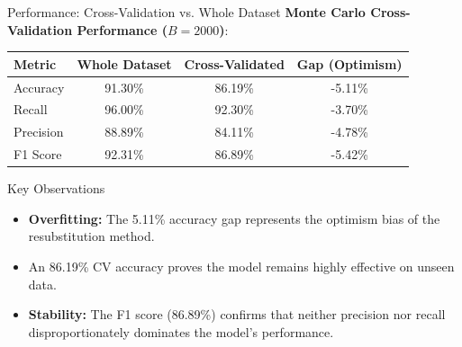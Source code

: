 \documentclass[8pt, aspectratio=169]{beamer}
\begin{document}
\begin{frame}{Performance: Cross-Validation vs. Whole Dataset}
    \textbf{Monte Carlo Cross-Validation Performance ($B=2000$)}:
    \begin{table}
        \centering
        \begin{tabular}{lccc}
            \toprule
            Metric & Whole Dataset & Cross-Validated & Gap (Optimism) \\
            \midrule
            Accuracy & 91.30\% & 86.19\% & -5.11\% \\
            Recall  & 96.00\% & 92.30\% & -3.70\% \\
            Precision & 88.89\% & 84.11\% & -4.78\% \\
            F1 Score & 92.31\% & 86.89\% &  -5.42\% \\
            \bottomrule
        \end{tabular}
    \end{table}
    \begin{alertblock}{Key Observations}
        \begin{itemize}
        \item \textbf{Overfitting:} The 5.11\% accuracy gap represents the optimism bias of the resubstitution method.
        \item An 86.19\% CV accuracy proves the model remains highly effective on unseen data.
        \item \textbf{Stability:} The F1 score (86.89\%) confirms that neither precision nor recall disproportionately dominates the model's performance.
    \end{itemize}
    \end{alertblock}
    
\end{frame}
\end{document}
